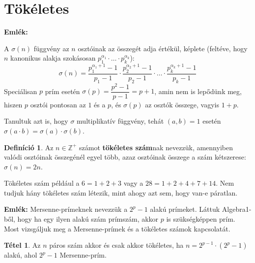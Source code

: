 \documentclass[12pt]{book}
\theoremstyle{plain} %
\theoremstyle{definition} %
\newtheorem{defi/}{Definíció}[section]
\newenvironment{defi}
  {\renewcommand{\qedsymbol}{$\clubsuit$}%
   \pushQED{\qed}\begin{defi/}}
  {\popQED\end{defi/}}
\newtheorem{theo/}{Tétel}[section]
\newenvironment{theo}
  {\renewcommand{\qedsymbol}{$\clubsuit$}%
   \pushQED{\qed}\begin{theo/}}
  {\popQED\end{theo/}}
\theoremstyle{remark}
\renewcommand\qedsymbol{$\blacksquare$}
\numberwithin{equation}{section}  %
\def\Z{\mathbb{Z}}
\begin{document}
	\section{Tökéletes}
	
	\textbf{Emlék: }
	
	A $\sigma(n)$ függvény az $n$ osztóinak az összegét adja értékül, képlete (feltéve, hogy $n$ kanonikus alakja szokásosan $p_1^{\alpha_1} \cdot \ldots \cdot p_k^{\alpha_k}$):
	\[ \sigma(n) = \dfrac{p_1^{\alpha_1+1}-1}{p_1 -1} \cdot \dfrac{p_2^{\alpha_2+1}-1}{p_2 -1} \cdot \ldots \cdot \dfrac{p_k^{\alpha_k+1}-1}{p_k -1} \]
	Speciálisan $p$ prím esetén $\sigma(p) = \dfrac{p^2-1}{p-1} = p+1$, amin nem is lepődünk meg, hiszen $p$ osztói pontosan az $1$ és a $p$, és $\sigma(p)$ az osztók összege, vagyis $1+p$.
	
	Tanultuk azt is, hogy $\sigma$ multiplikatív függvény, tehát $(a,b)=1$ esetén $\sigma(a\cdot b)= \sigma(a)\cdot \sigma(b)$.
	
	\begin{defi}
		Az $n\in \Z^{+}$ számot \textbf{tökéletes szám}nak nevezzük, amennyiben valódi osztóinak összegénél egyel több, azaz osztóinak összege a szám kétszerese: $\sigma(n) = 2n$.
	\end{defi}

	Tökéletes szám például a $6=1+2+3$ vagy a $28=1+2+4+7+14$. Nem tudjuk hány tökéletes szám létezik, mint ahogy azt sem, hogy van-e páratlan.

	\textbf{Emlék:} Mersenne-prímeknek nevezzük a $2^p-1$ alakú prímeket. Láttuk Algebra1-ből, hogy ha egy ilyen alakú szám prímszám, akkor $p$ is szükségképpen prím. Most vizsgáljuk meg a Mersenne-prímek és a tökéletes számok kapcsolatát.
	
	\begin{theo}
		Az $n$ páros szám akkor és csak akkor tökéletes, ha $n=2^{p-1}\cdot (2^p - 1)$ alakú, ahol $2^p-1$ Mersenne-prím.
	\end{theo}
\end{document}
